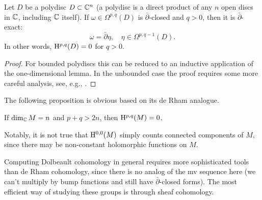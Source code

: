 \begin{thm} Let $D$ be a polydisc $D\subset \mathbb{C}^n$ (a polydisc is a direct product of any $n$ open discs in $\mathbb{C}$, including $\mathbb{C}$ itself). If $\omega\in\Omega^{p,q}(D)$ is $\bar\partial$-closed and $q>0$, then it is $\bar\partial$-exact:
    \[\omega=\bar\partial\eta,\quad \eta\in\Omega^{p,q-1}(D).\]
    In other words, $\mathrm{H}^{p,q}(D)=0$ for $q>0$.
\end{thm}
\begin{proof}
    For bounded polydiscs this can be reduced to an inductive application of the one-dimensional lemma. In the unbounded case the proof requires some more careful analysis, see, e.g., \cite[Prop.\ 1.3.8 and Cor.\ 1.3.9]{Huybrechts}.
\end{proof}

The following proposition is obvious based on its de Rham analogue.

\begin{prop}
    If $\dim_{\mathbb{C}} M=n$ and $p+q>2n$, then $\mathrm{H}^{p,q}(M)=0$.
\end{prop}

Notably, it is not true that $\mathrm{H}^{0,0}(M)$ simply counts connected components of $M$, since there may be non-constant holomorphic functions on $M$.

Computing Dolbeault cohomology in general requires more sophisticated tools than de Rham cohomology, since there is no analog of the \gls{mv} sequence here (we can't multiply by bump functions and still have $\bar\partial$-closed forms). The most efficient way of studying these groups is through sheaf cohomology.


